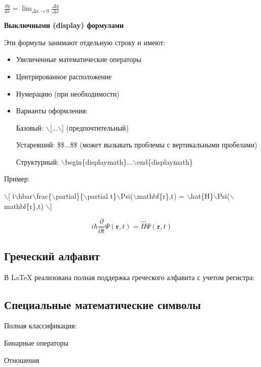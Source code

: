 \documentclass[a4paper, 14pt]{extarticle}
\newcommand{\n}{\par}
\begin{document}
	\( \frac{dy}{dx} = \lim_{\Delta x \to 0} \frac{\Delta y}{\Delta x} \)
	
	\textbf{Выключными (display) формулами} \n
	Эти формулы занимают отдельную строку и имеют:
	\begin{itemize}
	\item Увеличенные математические операторы
		
	\item Центрированное расположение
		
	\item Нумерацию (при необходимости)
		
	\item Варианты оформления:\n
		
		Базовый: $\backslash$[...$\backslash$] (предпочтительный)\n
		
		Устаревший: \$\$...\$\$ (может вызывать проблемы с вертикальными пробелами)\n
		
		Структурный: $\backslash$begin\{displaymath\}...$\backslash$end\{displaymath\}
		
	\end{itemize}
	
	Пример:\n
	$\backslash$[ i$\backslash$hbar$\backslash$frac\{$\backslash$partial\}\{$\backslash$partial t\}$\backslash$Psi($\backslash$mathbf\{r\},t) = $\backslash$hat\{H\}$\backslash$Psi($\backslash$mathbf\{r\},t) $\backslash$]
	
	\[ i\hbar\frac{\partial}{\partial t}\Psi(\mathbf{r},t) = \hat{H}\Psi(\mathbf{r},t) \]
	\subsection{Греческий алфавит}
	В \LaTeX{} реализована полная поддержка греческого алфавита с учетом регистра:
%	
%	
%	
%	
%	
	\subsection*{Специальные математические символы}
	Полная классификация:
	
	Бинарные операторы
	
	Отношения
\end{document}
